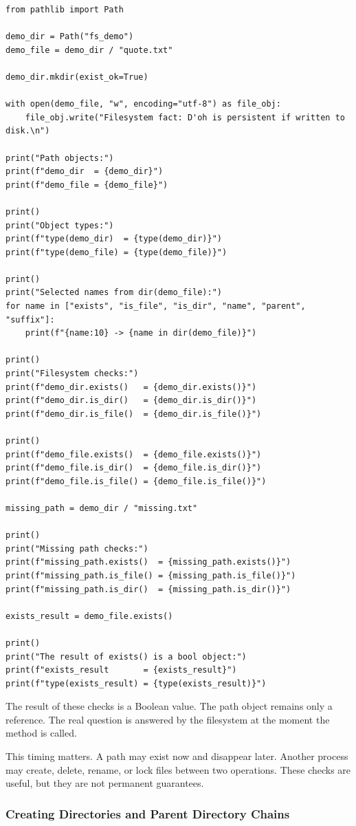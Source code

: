 \begin{verbatim}
from pathlib import Path

demo_dir = Path("fs_demo")
demo_file = demo_dir / "quote.txt"

demo_dir.mkdir(exist_ok=True)

with open(demo_file, "w", encoding="utf-8") as file_obj:
    file_obj.write("Filesystem fact: D'oh is persistent if written to disk.\n")

print("Path objects:")
print(f"demo_dir  = {demo_dir}")
print(f"demo_file = {demo_file}")

print()
print("Object types:")
print(f"type(demo_dir)  = {type(demo_dir)}")
print(f"type(demo_file) = {type(demo_file)}")

print()
print("Selected names from dir(demo_file):")
for name in ["exists", "is_file", "is_dir", "name", "parent", "suffix"]:
    print(f"{name:10} -> {name in dir(demo_file)}")

print()
print("Filesystem checks:")
print(f"demo_dir.exists()   = {demo_dir.exists()}")
print(f"demo_dir.is_dir()   = {demo_dir.is_dir()}")
print(f"demo_dir.is_file()  = {demo_dir.is_file()}")

print()
print(f"demo_file.exists()  = {demo_file.exists()}")
print(f"demo_file.is_dir()  = {demo_file.is_dir()}")
print(f"demo_file.is_file() = {demo_file.is_file()}")

missing_path = demo_dir / "missing.txt"

print()
print("Missing path checks:")
print(f"missing_path.exists()  = {missing_path.exists()}")
print(f"missing_path.is_file() = {missing_path.is_file()}")
print(f"missing_path.is_dir()  = {missing_path.is_dir()}")

exists_result = demo_file.exists()

print()
print("The result of exists() is a bool object:")
print(f"exists_result       = {exists_result}")
print(f"type(exists_result) = {type(exists_result)}")
\end{verbatim}

The result of these checks is a Boolean value. The path object remains only a reference. The real question is answered by the filesystem at the moment the method is called.

This timing matters. A path may exist now and disappear later. Another process may create, delete, rename, or lock files between two operations. These checks are useful, but they are not permanent guarantees.

\subsubsection{Creating Directories and Parent Directory Chains}

